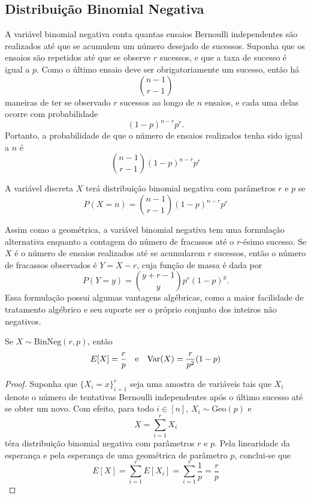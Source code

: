 \subsection{Distribuição Binomial Negativa}

A variável binomial negativa conta quantas ensaios Bernoulli independentes são realizados
até que se acumulem um número desejado de sucessos.
Suponha que os ensaios são repetidos até que se observe $r$ sucessos, e que a taxa de
sucesso é igual a $p$.
Como o último ensaio deve ser obrigatoriamente um sucesso, então há
\[
    \binom{n-1}{r-1}
\]
maneiras de ter se observado $r$ sucessos ao longo de $n$ ensaios, e cada uma delas
ocorre com probabilidade
\[
    (1-p)^{n-r}p^r.
\]
Portanto, a probabilidade de que o número de ensaios realizados tenha sido igual a $n$ é
\[
    \binom{n-1}{r-1} (1-p)^{n-r} p^r
\]

\begin{def:binomial negativa}
A variável discreta $X$ terá distribuição binomial negativa com parâmetros $r$ e $p$ se
\[
    P(X = n) = \binom{n-1}{r-1} (1-p)^{n-r} p^r
\]
\end{def:binomial negativa}

\begin{obs:binomial negativa 1}
Assim como a geométrica, a variável binomial negativa tem uma formulação alternativa
enquanto a contagem do número de fracassos até o $r$-ésimo sucesso.
Se $X$ é o número de ensaios realizados até se acumularem $r$ sucessos, então o número
de fracassos observados é $Y = X - r$, cuja função de massa é dada por
\[
    P(Y = y) = \binom{y+r-1}{y} p^r (1-p)^y.
\]
Essa formulação possui algumas vantagens algébricas, como a maior facilidade de tratamento
algébrico e seu suporte ser o próprio conjunto dos inteiros não negativos.
\end{obs:binomial negativa 1}

\begin{prop:esperanca binomial negativa}
Se $X \sim \mathrm{BinNeg}(r, p)$, então
\[
	E[X] = \frac{r}{p} \quad \text{e} \quad \mathrm{Var}\!\left(X\right) = \frac{r}{p^2} (1-p)
\]
\begin{proof}
	Suponha que $\{X_i = x\}_{i=1}^r$ seja uma amostra de variáveis tais que
	$X_i$ denote o número de tentativas Bernoulli independentes após o último sucesso até
	se obter um novo.
	Com efeito, para todo $i \in [n]$, $X_i \sim \mathrm{Geo}(p)$ e
	\[
		X = \sum_{i = 1}^r X_i
	\]
	téra distribuição binomial negativa com parâmetros $r$ e $p$.
	Pela linearidade da esperança e pela esperança de uma geométrica de parâmetro $p$,
	conclui-se que
	\[
		E[X] = \sum_{i = 1}^r E[X_i] = \sum_{i=1}^r \frac{1}{p} = \frac{r}{p}
	\]
\end{proof}
\end{prop:esperanca binomial negativa}

